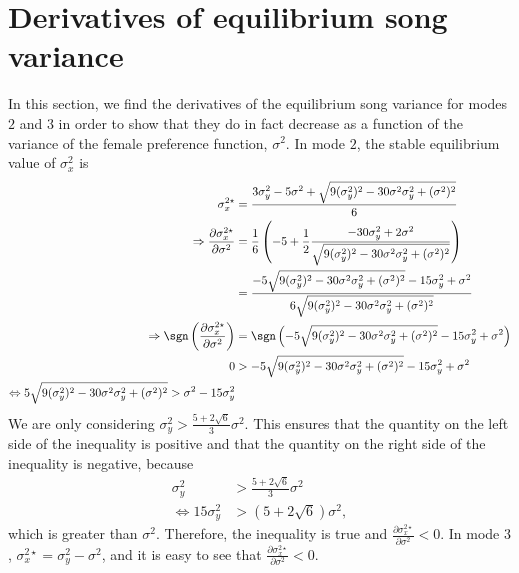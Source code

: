 \documentclass{article}
\begin{document}
\section{Derivatives of equilibrium song variance \label{sigmax2_derivatives}}
In this section, we find the derivatives of the equilibrium song variance for modes $2$ and $3$ in order to show that they do in fact decrease as a function of the variance of the female preference function, $\sigma^2$. In mode $2$, the stable equilibrium value of $\sigma_x^2$ is 
\begin{align*}
\sigma_x^{2\star}&=\frac{3\sigma_y^2-5\sigma^2+\sqrt{9(\sigma_y^2)^2-30\sigma^2\sigma_y^2+(\sigma^2)^2}}{6}
\\ \Rightarrow \frac{\partial \sigma_x^{2\star}}{\partial \sigma^2}&=\frac{1}{6}\left(-5+\frac{1}{2}\frac{-30\sigma_y^2+2\sigma^2}{\sqrt{9(\sigma_y^2)^2-30\sigma^2\sigma_y^2+(\sigma^2)^2}}\right)
\\&=\frac{-5\sqrt{9(\sigma_y^2)^2-30\sigma^2\sigma_y^2+(\sigma^2)^2}-15\sigma_y^2+\sigma^2}{6\sqrt{9(\sigma_y^2)^2-30\sigma^2\sigma_y^2+(\sigma^2)^2}}
\\\Rightarrow \sgn\left(\frac{\partial \sigma_x^{2\star}}{\partial \sigma^2}\right)&=\sgn\left(-5\sqrt{9(\sigma_y^2)^2-30\sigma^2\sigma_y^2+(\sigma^2)^2}-15\sigma_y^2+\sigma^2\right)
\\0&>-5\sqrt{9(\sigma_y^2)^2-30\sigma^2\sigma_y^2+(\sigma^2)^2}-15\sigma_y^2+\sigma^2
\\ \Leftrightarrow 5\sqrt{9(\sigma_y^2)^2-30\sigma^2\sigma_y^2+(\sigma^2)^2}>\sigma^2-15\sigma_y^2
\end{align*}
We are only considering $\sigma_y^2>\frac{5+2\sqrt{6}}{3}\sigma^2$. This ensures that the quantity on the left side of the inequality is positive and that the quantity on the right side of the inequality is negative, because 
\begin{align*}
\sigma_y^2&>\frac{5+2\sqrt{6}}{3}\sigma^2
\\ \Leftrightarrow 15\sigma_y^2&>(5+2\sqrt{6})\sigma^2,
\end{align*}
which is greater than $\sigma^2$.
Therefore, the inequality is true and $\frac{\partial \sigma_x^{2\star}}{\partial \sigma^2}<0$. In mode $3$, $\sigma_x^{2\star}=\sigma_y^2-\sigma^2$, and it is easy to see that $\frac{\partial \sigma_x^{2\star}}{\partial \sigma^2}<0$.
\end{document}
